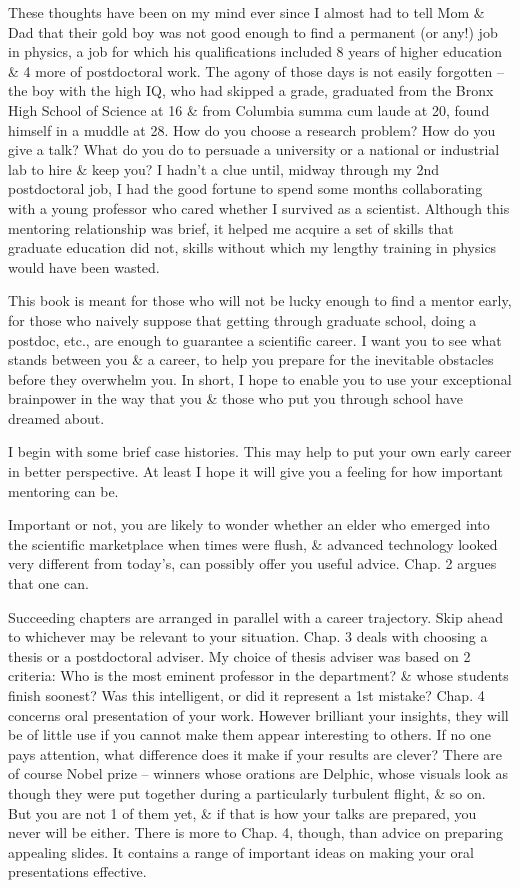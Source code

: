 \documentclass{article}
\begin{document}
\begin{enumerate}
\begin{itemize}
		These thoughts have been on my mind ever since I almost had to tell Mom \& Dad that their gold boy was not good enough to find a permanent (or any!) job in physics, a job for which his qualifications included 8 years of higher education \& 4 more of postdoctoral work. The agony of those days is not easily forgotten -- the boy with the high IQ, who had skipped a grade, graduated from the Bronx High School of Science at 16 \& from Columbia summa cum laude at 20, found himself in a muddle at 28. How do you choose a research problem? How do you give a talk? What do you do to persuade a university or a national or industrial lab to hire \& keep you? I hadn't a clue until, midway through my 2nd postdoctoral job, I had the good fortune to spend some months collaborating with a young professor who cared whether I survived as a scientist. Although this mentoring relationship was brief, it helped me acquire a set of skills that graduate education did not, skills without which my lengthy training in physics would have been wasted.

		This book is meant for those who will not be lucky enough to find a mentor early, for those who naively suppose that getting through graduate school, doing a postdoc, etc., are enough to guarantee a scientific career. I want you to see what stands between you \& a career, to help you prepare for the inevitable obstacles before they overwhelm you. In short, I hope to enable you to use your exceptional brainpower in the way that you \& those who put you through school have dreamed about.

		I begin with some brief case histories. This may help to put your own early career in better perspective. At least I hope it will give you a feeling for how important mentoring can be.

		Important or not, you are likely to wonder whether an elder who emerged into the scientific marketplace when times were flush, \& advanced technology looked very different from today's, can possibly offer you useful advice. Chap. 2 argues that one can.

		Succeeding chapters are arranged in parallel with a career trajectory. Skip ahead to whichever may be relevant to your situation. Chap. 3 deals with choosing a thesis or a postdoctoral adviser. My choice of thesis adviser was based on 2 criteria: Who is the most eminent professor in the department? \& whose students finish soonest? Was this intelligent, or did it represent a 1st mistake? Chap. 4 concerns oral presentation of your work. However brilliant your insights, they will be of little use if you cannot make them appear interesting to others. If no one pays attention, what difference does it make if your results are clever? There are of course Nobel prize -- winners whose orations are Delphic, whose visuals look as though they were put together during a particularly turbulent flight, \& so on. But you are not 1 of them yet, \& if that is how your talks are prepared, you never will be either. There is more to Chap. 4, though, than advice on preparing appealing slides. It contains a range of important ideas on making your oral presentations effective.


\end{itemize}
\end{enumerate}
\end{document}
